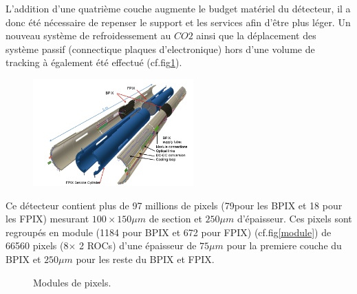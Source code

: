 L'addition d'une quatrième couche augmente le budget matériel du détecteur, il a donc été nécessaire de repenser le support et les services afin d'être plus léger. 
Un nouveau système de refroidessement au $CO2$ ainsi que la déplacement des système passif (connectique plaques d'electronique) hors d'une volume de tracking à également été effectué (cf.fig\ref{pixel2}).
\begin{figure}[h!]
	\centering
	\includegraphics[width=0.55\textwidth]{CMS/pixel3.png}
	\label{pixel2}
\end{figure}

Ce détecteur contient plus de 97 millions de pixels (79pour les BPIX et 18 pour les FPIX) mesurant $100\times150\mu m$ de section et $250\mu m$ d'épaisseur. Ces pixels sont regroupés en module (1184 pour BPIX et 672 pour FPIX) (cf.fig\ref{module}) de 66560 pixels  (8$\times$ 2 ROCs) d'une épaisseur de $75\mu m$ pour la premiere couche du BPIX et $250\mu m$ pour les reste du BPIX et FPIX.
	\begin{figure}[h!]
		\centering
	\caption{Modules de pixels.}
	\label{pixel}
\end{figure}